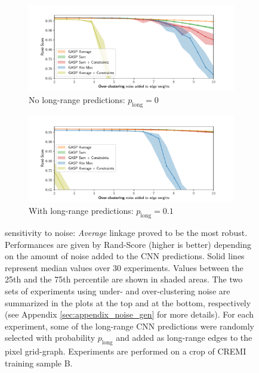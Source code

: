 \begin{figure}
        \begin{subfigure}[t]{0.49 \textwidth}
        \centering
        \includegraphics[width=\textwidth,trim=0.53in 0.1in 0.65in 0.45in,clip]{./figs/noise_plots/over_segment_plots_0.pdf}
        \caption{No long-range predictions: $p_{\mathrm{long}}=0$} \label{fig:merge_noise_only_direct}
    \end{subfigure} \hfill
    \begin{subfigure}[t]{0.49 \textwidth}
        \centering
        \includegraphics[width=\textwidth,trim=0.53in 0.1in 0.65in 0.45in,clip]{./figs/noise_plots/over_segment_plots_1.pdf}
        \caption{With long-range predictions: $p_{\mathrm{long}}=0.1$} \label{fig:merge_noise_with_long_range}
    \end{subfigure}
\caption{\algname{} sensitivity to noise: \emph{Average} linkage proved to be the most robust. Performances are given by Rand-Score (higher is better) depending on the amount of noise added to the CNN predictions. Solid lines represent median values over 30 experiments. Values between the 25th and the 75th percentile are shown in shaded areas. The two sets of experiments using under- and over-clustering noise are summarized in the plots at the top and at the bottom, respectively (see Appendix \ref{sec:appendix_noise_gen} for more details). For each experiment, some of the long-range CNN predictions were randomly selected with probability $p_{\mathrm{long}}$ and added as long-range edges to the pixel grid-graph. Experiments are performed on a crop of CREMI training sample B.
}\label{fig:noise_plots}
\end{figure}
